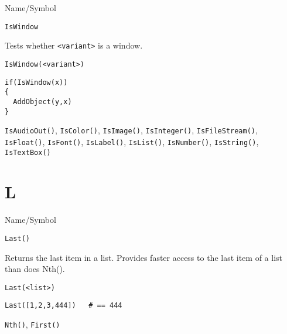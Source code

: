 \begin{desc}{Name/Symbol}
\item[Name/Symbol]	\verb+IsWindow+

\item[Description]	Tests whether \verb+<variant>+ is a window.

\item[Usage]		
\begin{verbatim}
IsWindow(<variant>)
\end{verbatim}

\item[Example]	
\begin{verbatim}
if(IsWindow(x))
{
  AddObject(y,x)
}
\end{verbatim}

\item[See Also] \verb+IsAudioOut()+, \verb+IsColor()+,
  \verb+IsImage()+, \verb+IsInteger()+, \verb+IsFileStream()+,
  \verb+IsFloat()+, \verb+IsFont()+, \verb+IsLabel()+,
  \verb+IsList()+, \verb+IsNumber()+, \verb+IsString()+,
  \verb+IsTextBox()+
\end{desc}

\rl




\section{L}
\rl

\begin{desc}{Name/Symbol}
\item[Name/Symbol]	\verb+Last()+

\item[Description]	Returns the last item in a list. Provides faster 
		access to the last item of a list than does Nth().

\item[Usage]
\begin{verbatim}
Last(<list>)
\end{verbatim}

\item[Example]
\begin{verbatim}
Last([1,2,3,444])	# == 444
\end{verbatim}

\item[See Also]	\verb+Nth()+, \verb+First()+
\end{desc}

\rl





